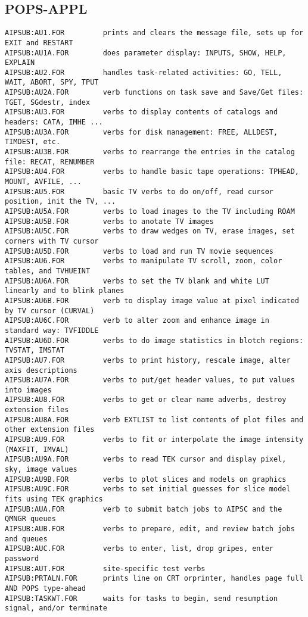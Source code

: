 \subsection{POPS-APPL}
\begin{verbatim}
AIPSUB:AU1.FOR         prints and clears the message file, sets up for EXIT and RESTART
AIPSUB:AU1A.FOR        does parameter display: INPUTS, SHOW, HELP, EXPLAIN
AIPSUB:AU2.FOR         handles task-related activities: GO, TELL, WAIT, ABORT, SPY, TPUT
AIPSUB:AU2A.FOR        verb functions on task save and Save/Get files: TGET, SGdestr, index
AIPSUB:AU3.FOR         verbs to display contents of catalogs and headers: CATA, IMHE ...
AIPSUB:AU3A.FOR        verbs for disk management: FREE, ALLDEST, TIMDEST, etc.
AIPSUB:AU3B.FOR        verbs to rearrange the entries in the catalog file: RECAT, RENUMBER
AIPSUB:AU4.FOR         verbs to handle basic tape operations: TPHEAD, MOUNT, AVFILE, ...
AIPSUB:AU5.FOR         basic TV verbs to do on/off, read cursor position, init the TV, ...
AIPSUB:AU5A.FOR        verbs to load images to the TV including ROAM
AIPSUB:AU5B.FOR        verbs to anotate TV images
AIPSUB:AU5C.FOR        verbs to draw wedges on TV, erase images, set corners with TV cursor
AIPSUB:AU5D.FOR        verbs to load and run TV movie sequences
AIPSUB:AU6.FOR         verbs to manipulate TV scroll, zoom, color tables, and TVHUEINT
AIPSUB:AU6A.FOR        verbs to set the TV blank and white LUT linearly and to blink planes
AIPSUB:AU6B.FOR        verb to display image value at pixel indicated by TV cursor (CURVAL)
AIPSUB:AU6C.FOR        verb to alter zoom and enhance image in standard way: TVFIDDLE
AIPSUB:AU6D.FOR        verbs to do image statistics in blotch regions: TVSTAT, IMSTAT
AIPSUB:AU7.FOR         verbs to print history, rescale image, alter axis descriptions
AIPSUB:AU7A.FOR        verbs to put/get header values, to put values into images
AIPSUB:AU8.FOR         verbs to get or clear name adverbs, destroy extension files
AIPSUB:AU8A.FOR        verb EXTLIST to list contents of plot files and other extension files
AIPSUB:AU9.FOR         verbs to fit or interpolate the image intensity (MAXFIT, IMVAL)
AIPSUB:AU9A.FOR        verbs to read TEK cursor and display pixel, sky, image values
AIPSUB:AU9B.FOR        verbs to plot slices and models on graphics
AIPSUB:AU9C.FOR        verbs to set initial guesses for slice model fits using TEK graphics
AIPSUB:AUA.FOR         verb to submit batch jobs to AIPSC and the QMNGR queues
AIPSUB:AUB.FOR         verbs to prepare, edit, and review batch jobs and queues
AIPSUB:AUC.FOR         verbs to enter, list, drop gripes, enter password
AIPSUB:AUT.FOR         site-specific test verbs
AIPSUB:PRTALN.FOR      prints line on CRT orprinter, handles page full AND POPS type-ahead
AIPSUB:TASKWT.FOR      waits for tasks to begin, send resumption signal, and/or terminate
\end{verbatim}
 
